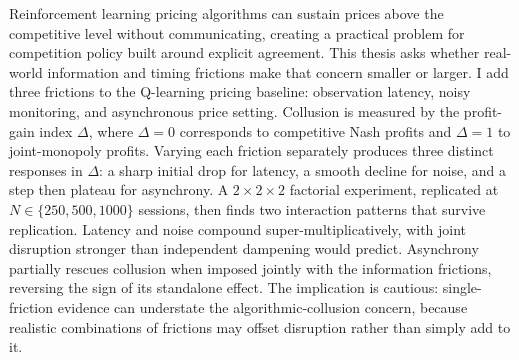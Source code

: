 Reinforcement learning pricing algorithms can sustain prices above the competitive level without communicating, creating a practical problem for competition policy built around explicit agreement. This thesis asks whether real-world information and timing frictions make that concern smaller or larger. I add three frictions to the \citet{calvano2020} Q-learning pricing baseline: observation latency, noisy monitoring, and asynchronous price setting. Collusion is measured by the profit-gain index $\Delta$, where $\Delta=0$ corresponds to competitive Nash profits and $\Delta=1$ to joint-monopoly profits. Varying each friction separately produces three distinct responses in $\Delta$: a sharp initial drop for latency, a smooth decline for noise, and a step then plateau for asynchrony. A $2\times 2\times 2$ factorial experiment, replicated at $N\in\{250,500,1000\}$ sessions, then finds two interaction patterns that survive replication. Latency and noise compound super-multiplicatively, with joint disruption stronger than independent dampening would predict. Asynchrony partially rescues collusion when imposed jointly with the information frictions, reversing the sign of its standalone effect. The implication is cautious: single-friction evidence can understate the algorithmic-collusion concern, because realistic combinations of frictions may offset disruption rather than simply add to it.

